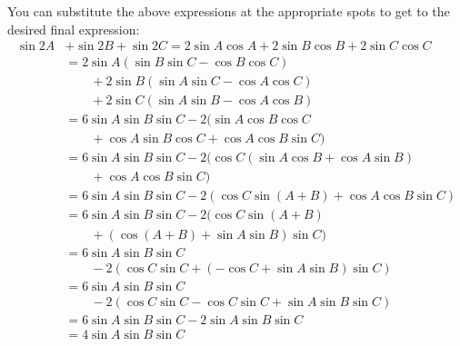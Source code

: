 \documentclass{exam}
\begin{document}
    \pagebreak

    You can substitute the above expressions at the appropriate spots to get to the desired final expression:
    \begin{align*}
      \sin 2A & + \sin 2B + \sin 2C  = 2 \sin A \cos A + 2 \sin B \cos B + 2 \sin C \cos C \\
              & = 2 \sin A ( \sin B \sin C - \cos B \cos C ) \\
                & \qquad{} + 2 \sin B ( \sin A \sin C - \cos A \cos C ) \\
                & \qquad{} + 2 \sin C ( \sin A \sin B - \cos A \cos B ) \\
              & = 6 \sin A \sin B \sin C  - 2 (\sin A \cos B \cos C \\
                & \qquad{} + \cos A \sin B \cos C + \cos A \cos B \sin C) \\
              & = 6 \sin A \sin B \sin C  - 2 ( \cos C ( \sin A \cos B + \cos A \sin B ) \\
                & \qquad{} + \cos A \cos B \sin C) \\
              & = 6 \sin A \sin B \sin C  - 2 ( \cos C \sin (A + B) + \cos A \cos B \sin C) \\
              & = 6 \sin A \sin B \sin C  - 2 ( \cos C \sin (A + B) \\
                & \qquad{} + ( \cos (A + B) + \sin A \sin B ) \sin C) \\
              & = 6 \sin A \sin B \sin C \\
                & \qquad{} - 2 ( \cos C \sin C + ( - \cos C + \sin A \sin B ) \sin C) \\
              & = 6 \sin A \sin B \sin C \\
                & \qquad{} - 2 ( \cos C \sin C  - \cos C \sin C + \sin A \sin B \sin C) \\
              & = 6 \sin A \sin B \sin C  - 2 \sin A \sin B \sin C \\
              & = 4 \sin A \sin B \sin C \\
    \end{align*}
  \fi


  \ifprintanswers
    \pagebreak
\end{document}
